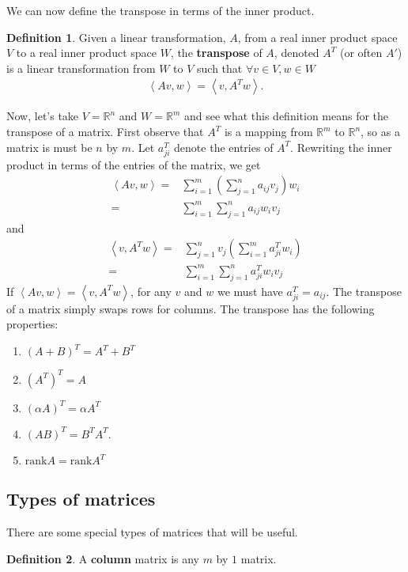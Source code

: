 \documentclass[12pt,reqno]{amsart}
\def\R{\mathbb{R}}
\newcommand{\iprod}[2]{\left\langle {#1} , {#2} \right\rangle}
\newcommand{\rank}{\mathrm{rank}}
\theoremstyle{definition}
\newtheorem{definition}{Definition}[section]
\begin{document}
We can now define the transpose in terms of the inner product.
\begin{definition}
  Given a linear transformation, $A$, from a real inner product space
  $V$ to a real inner product space $W$, the
  \textbf{transpose} of $A$, denoted $A^T$ (or often $A'$) is a
  linear transformation from $W$ to $V$ such that $\forall v \in V, w
  \in W$
  \begin{align*}
    \iprod{A v}{w} = \iprod{v}{A^T w}.
  \end{align*}
\end{definition}
Now, let's take $V=\R^n$ and $W = \R^m$ and see what this definition
means for the transpose of a matrix. First observe that $A^T$ is a
mapping from $\R^m$ to $\R^n$, so as a matrix is must be $n$ by
$m$. Let $a^T_{ji}$ denote the entries of $A^T$. Rewriting the
inner product in terms of the entries of the matrix, we get
\begin{align*}
  \iprod{Av}{w} = & \sum_{i=1}^m \left(\sum_{j=1}^n a_{ij} v_j \right)
  w_i  \\
  = & \sum_{i=1}^m \sum_{j=1}^n a_{ij} w_i v_j
\end{align*}
and 
\begin{align*}
  \iprod{v}{A^T w} = & \sum_{j=1}^n v_j \left(\sum_{i=1}^m a_{ji}^T
    w_i\right) \\
  = & \sum_{i=1}^m \sum_{j=1}^n a_{ji}^T w_i v_j
\end{align*}
If $\iprod{A v}{w} = \iprod{v}{A^T w} $, for any $v$ and $w$ we must
have $a_{ji}^T = a_{ij}$. The transpose of a matrix simply swaps rows
for columns. The transpose has the following properties:
\begin{enumerate}
\item $(A+B)^T = A^T + B^T$
\item $(A^T)^T = A$
\item $(\alpha A)^T = \alpha A^T$
\item $(AB)^T = B^T A^T$.
\item $\rank A = \rank A^T$
\end{enumerate}

\subsection{Types of matrices}

There are some special types of matrices that will be useful.
\begin{definition}
  A \textbf{column} matrix is any $m$ by $1$ matrix.
\end{definition}
\end{document}
